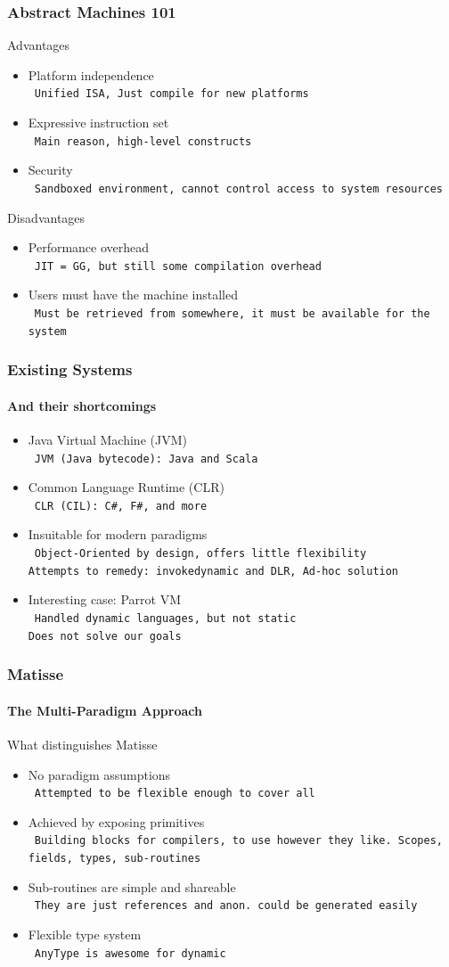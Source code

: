\documentclass{beamer}
\newcommand{\n}[1]{\leavevmode\\~\texttt{\color{red}\tiny #1}}
\begin{document}
\begin{frame}
  \frametitle{Abstract Machines 101}

  Advantages
  \begin{itemize}[<+->]
  \item Platform independence
    \n{Unified ISA, Just compile for new platforms}
  \item Expressive instruction set
    \n{Main reason, high-level constructs}
  \item Security
    \n{Sandboxed environment, cannot control access to system resources}
  \end{itemize}


  Disadvantages
  \begin{itemize}[<+->]
  \item Performance overhead
    \n{JIT = GG, but still some compilation overhead}
  \item Users must have the machine installed
    \n{Must be retrieved from somewhere, it must be available for the system}
  \end{itemize}

\end{frame}

\begin{frame}
  \frametitle{Existing Systems}
  \framesubtitle{And their shortcomings}

  \begin{itemize}[<+->]
  \item Java Virtual Machine (JVM)
    \n{JVM (Java bytecode): Java and Scala}
  \item Common Language Runtime (CLR)
    \n{CLR (CIL): C\#, F\#, and more}
  \item Insuitable for modern paradigms
    \n{Object-Oriented by design, offers little flexibility\\
       Attempts to remedy: {\tt invokedynamic} and DLR, Ad-hoc solution
    }
  \item Interesting case: Parrot VM
    \n{Handled dynamic languages, but not static\\
       Does not solve our goals
     }
  \end{itemize}
\end{frame}

\begin{frame}
  \frametitle{Matisse}
  \framesubtitle{The Multi-Paradigm Approach}

  What distinguishes Matisse
  \begin{itemize}[<+->]
  \item No paradigm assumptions
    \n{Attempted to be flexible enough to cover all}
  \item Achieved by exposing primitives
    \n{Building blocks for compilers, to use however they like. Scopes, fields, types, sub-routines}
  \item Sub-routines are simple and shareable
    \n{They are just references and anon. could be generated easily}
  \item Flexible type system
    \n{AnyType is awesome for dynamic}
  \end{itemize}
\end{frame}
\end{document}
